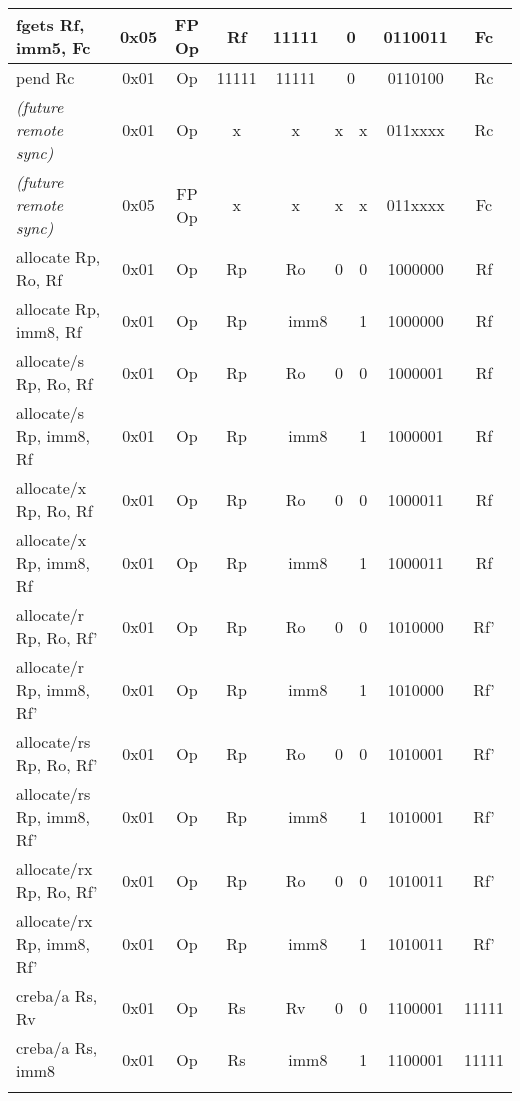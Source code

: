 \documentclass[a4paper,11pt]{article}
\begin{document}
\begin{table}
\begin{center}
{\begin{tabular}{|>{\ttfamily}l||c|c|c|c|c|c|c|c|}
fgets  Rf, imm5, Fc     & 0x05 & FP Op  & Rf & 11111 & \multicolumn{2}{c|}{0} &   0110011 & Fc \\ \cline{6-7}
pend  Rc                      & 0x01 & Op  & 11111 & 11111 & \multicolumn{2}{c|}{0} &   0110100 & Rc \\ \cline{6-7}
\hline\hline
\normalfont \emph{(future remote sync)} & 0x01 & Op & x & x & x & x & 011xxxx & Rc \\
\normalfont \emph{(future remote sync)} & 0x05 & FP Op & x & x & x & x & 011xxxx & Fc \\
\hline \hline
allocate Rp, Ro, Rf     & 0x01 & Op     & Rp &                    Ro & 0 & 0 & 1000000 & Rf \\ \cline{5-6}
allocate Rp, imm8, Rf   & 0x01 & Op     & Rp & \multicolumn{2}{c|}{imm8} & 1 & 1000000 & Rf \\ \cline{5-6}
allocate/s Rp, Ro, Rf   & 0x01 & Op     & Rp &                    Ro & 0 & 0 & 1000001 & Rf \\ \cline{5-6}
allocate/s Rp, imm8, Rf & 0x01 & Op     & Rp & \multicolumn{2}{c|}{imm8} & 1 & 1000001 & Rf \\ \cline{5-6}
allocate/x Rp, Ro, Rf   & 0x01 & Op     & Rp &                    Ro & 0 & 0 & 1000011 & Rf \\ \cline{5-6}
allocate/x Rp, imm8, Rf & 0x01 & Op     & Rp & \multicolumn{2}{c|}{imm8} & 1 & 1000011 & Rf \\ \cline{5-6}
allocate/r Rp, Ro, Rf'     & 0x01 & Op     & Rp &                    Ro & 0 & 0 & 1010000 & Rf' \\ \cline{5-6}
allocate/r Rp, imm8, Rf'   & 0x01 & Op     & Rp & \multicolumn{2}{c|}{imm8} & 1 & 1010000 & Rf' \\ \cline{5-6}
allocate/rs Rp, Ro, Rf'   & 0x01 & Op     & Rp &                    Ro & 0 & 0 & 1010001 & Rf' \\ \cline{5-6}
allocate/rs Rp, imm8, Rf' & 0x01 & Op     & Rp & \multicolumn{2}{c|}{imm8} & 1 & 1010001 & Rf' \\ \cline{5-6}
allocate/rx Rp, Ro, Rf'   & 0x01 & Op     & Rp &                    Ro & 0 & 0 & 1010011 & Rf' \\ \cline{5-6}
allocate/rx Rp, imm8, Rf' & 0x01 & Op     & Rp & \multicolumn{2}{c|}{imm8} & 1 & 1010011 & Rf' \\ \cline{5-6}
\hline \hline
creba/a Rs, Rv          & 0x01 & Op     & Rs &                    Rv & 0 & 0 & 1100001 & 11111 \\ \cline{5-6}
creba/a Rs, imm8        & 0x01 & Op     & Rs & \multicolumn{2}{c|}{imm8} & 1 & 1100001 & 11111 \\ \cline{5-6}

\end{tabular}}
\end{center}
\end{table}
\end{document}
